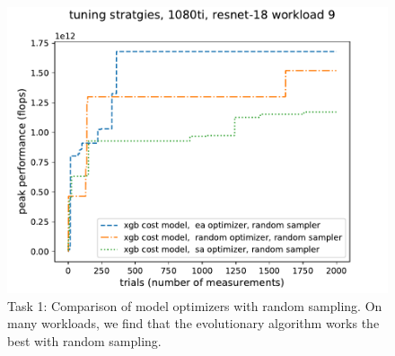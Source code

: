 \begin{figure}[tb]
\begin{center}
\includegraphics[width=\textwidth]{sys_figures/optimizer1080tiresnet-18_9_.pdf}
\end{center}
\caption{Task 1: Comparison of model optimizers with random sampling. On many workloads, we find that the evolutionary algorithm works the best with random sampling.}
\label{fig:optimizers}
\end{figure}
